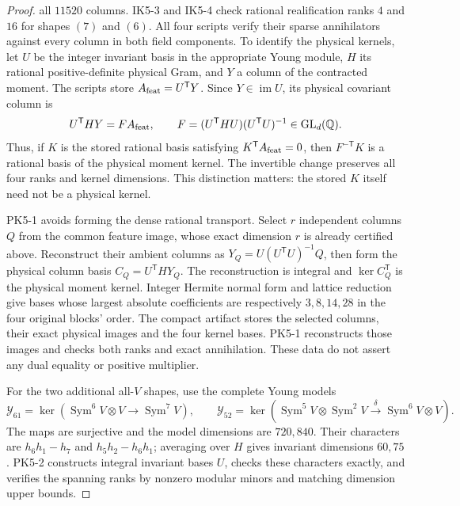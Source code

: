 \begin{proof}
all $11520$ columns.  IK5-3 and IK5-4 check rational realification
ranks $4$ and $16$ for shapes $(7)$ and $(6)$.  All four scripts verify their sparse annihilators
against every column in both field components.  To identify the physical kernels,
let $U$ be the integer invariant basis in the appropriate Young module,
$H$ its rational positive-definite physical Gram, and $Y$ a column of
the contracted moment.  The scripts store $A_{\rm feat}=U^{\mathsf T}Y$.
Since $Y\in\operatorname{im}U$, its physical covariant column is
\[
 U^{\mathsf T}HY=F A_{\rm feat},\qquad
 F=(U^{\mathsf T}HU)(U^{\mathsf T}U)^{-1}\in\operatorname{GL}_d(\mathbb Q).
\]
Thus, if $K$ is the stored rational basis satisfying
$K^{\mathsf T}A_{\rm feat}=0$, then $F^{-\mathsf T}K$ is a rational
basis of the physical moment kernel.  The invertible change preserves all
four ranks and kernel dimensions.  This distinction matters: the stored $K$ itself need not be a
physical kernel.

PK5-1 avoids forming the dense rational transport. Select $r$ independent
columns $Q$ from the common feature image, whose exact dimension $r$ is
already certified above. Reconstruct their ambient columns as
$Y_Q=U(U^{\mathsf T}U)^{-1}Q$, then form the physical column basis
$C_Q=U^{\mathsf T}H Y_Q$. The reconstruction is integral and
$\ker C_Q^{\mathsf T}$ is the physical moment kernel. Integer Hermite
normal form and lattice reduction give bases whose largest absolute
coefficients are respectively $3,8,14,28$ in the four original blocks' order.
The compact artifact stores the selected columns, their exact physical
images and the four kernel bases. PK5-1 reconstructs those images and
checks both ranks and exact annihilation. These data do not assert any
dual equality or positive multiplier.


For the two additional all-$V$ shapes, use the complete Young models
\[
 \mathcal Y_{61}=\ker(\operatorname{Sym}^6V\otimes V\to\operatorname{Sym}^7V),
 \qquad
 \mathcal Y_{52}=\ker(\operatorname{Sym}^5V\otimes\operatorname{Sym}^2V
       \xrightarrow{\delta}\operatorname{Sym}^6V\otimes V).
\]
The maps are surjective and the model dimensions are $720,840$.
Their characters are $h_6h_1-h_7$ and $h_5h_2-h_6h_1$; averaging over
$H$ gives invariant dimensions $60,75$. PK5-2 constructs integral invariant
bases $U$, checks these characters exactly, and verifies the spanning
ranks by nonzero modular minors and matching dimension upper bounds.


\end{proof}
